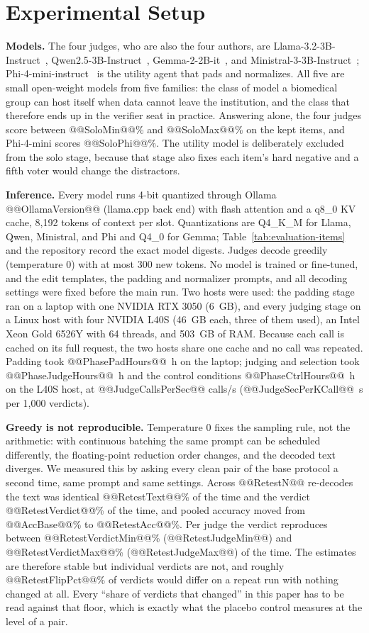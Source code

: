 \documentclass[conference]{IEEEtran}
\begin{document}
\section{Experimental Setup}
\textbf{Models.} The four judges, who are also the four authors, are Llama-3.2-3B-Instruct~\cite{b45}, Qwen2.5-3B-Instruct~\cite{b46}, Gemma-2-2B-it~\cite{b47}, and Ministral-3-3B-Instruct~\cite{b48}; Phi-4-mini-instruct~\cite{b40} is the utility agent that pads and normalizes. All five are small open-weight models from five families: the class of model a biomedical group can host itself when data cannot leave the institution, and the class that therefore ends up in the verifier seat in practice. Answering alone, the four judges score between @@SoloMin@@\% and @@SoloMax@@\% on the kept items, and Phi-4-mini scores @@SoloPhi@@\%. The utility model is deliberately excluded from the solo stage, because that stage also fixes each item's hard negative and a fifth voter would change the distractors.

\textbf{Inference.} Every model runs 4-bit quantized through Ollama @@OllamaVersion@@ (llama.cpp back end) with flash attention and a q8\_0 KV cache, 8,192 tokens of context per slot. Quantizations are Q4\_K\_M for Llama, Qwen, Ministral, and Phi and Q4\_0 for Gemma; Table~\ref{tab:evaluation-items} and the repository record the exact model digests. Judges decode greedily (temperature 0) with at most 300 new tokens. No model is trained or fine-tuned, and the edit templates, the padding and normalizer prompts, and all decoding settings were fixed before the main run. Two hosts were used: the padding stage ran on a laptop with one NVIDIA RTX 3050 (6~GB), and every judging stage on a Linux host with four NVIDIA L40S (46~GB each, three of them used), an Intel Xeon Gold 6526Y with 64 threads, and 503~GB of RAM. Because each call is cached on its full request, the two hosts share one cache and no call was repeated. Padding took @@PhasePadHours@@~h on the laptop; judging and selection took @@PhaseJudgeHours@@~h and the control conditions @@PhaseCtrlHours@@~h on the L40S host, at @@JudgeCallsPerSec@@ calls/s (@@JudgeSecPerKCall@@~s per 1,000 verdicts).

\textbf{Greedy is not reproducible.} Temperature 0 fixes the sampling rule, not the arithmetic: with continuous batching the same prompt can be scheduled differently, the floating-point reduction order changes, and the decoded text diverges. We measured this by asking every clean pair of the base protocol a second time, same prompt and same settings. Across @@RetestN@@ re-decodes the text was identical @@RetestText@@\% of the time and the verdict @@RetestVerdict@@\% of the time, and pooled accuracy moved from @@AccBase@@\% to @@RetestAcc@@\%. Per judge the verdict reproduces between @@RetestVerdictMin@@\% (@@RetestJudgeMin@@) and @@RetestVerdictMax@@\% (@@RetestJudgeMax@@) of the time. The estimates are therefore stable but individual verdicts are not, and roughly @@RetestFlipPct@@\% of verdicts would differ on a repeat run with nothing changed at all. Every ``share of verdicts that changed'' in this paper has to be read against that floor, which is exactly what the placebo control measures at the level of a pair.
\end{document}

